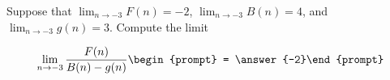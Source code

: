 \documentclass{ximera}
\author{Matthew Carr}
\begin{document}
\begin{exercise}
Suppose that $\lim_{n\to-3}F(n)=-2$, $\lim_{n\to-3}B(n)=4$, and $\lim_{n\to-3}g(n)=3$. Compute the limit

\[
\lim_{n\to -3 } \frac{F(n)}{B(n)-g(n)}\begin{prompt} = \answer{-2}\end{prompt}
\]
\end{exercise}
\end{document}
